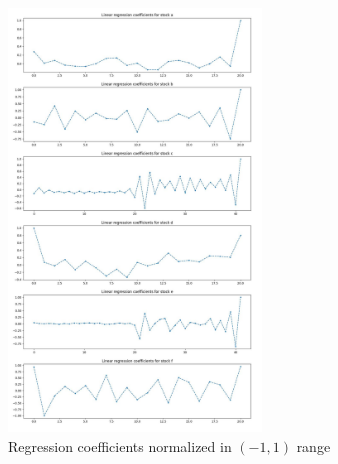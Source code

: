 \documentclass{article}
\begin{document}
\begin{figure}[htb]
	\centering
	\includegraphics[width=0.6\textwidth, ]{model_coeffs.jpg}
	\caption{Regression coefficients normalized in $(-1,1)$ range}
	\label{fig8}
\end{figure}	
\end{document}
